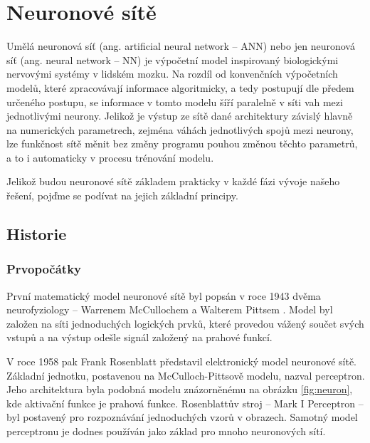 \chapter{Neuronové sítě}
\label{chap:NN}

Umělá neuronová síť (ang. artificial neural network – ANN) nebo jen neuronová
síť (ang. neural network – NN) je výpočetní model inspirovaný biologickými
nervovými systémy v lidském mozku. Na rozdíl od konvenčních výpočetních modelů,
které zpracovávají informace algoritmicky, a tedy postupují dle předem určeného
postupu, se informace v tomto modelu šíří paralelně v síti vah mezi
jednotlivými neurony. Jelikož je výstup ze sítě dané architektury závislý
hlavně na numerických parametrech, zejména váhách jednotlivých spojů mezi
neurony, lze funkčnost sítě měnit bez změny programu pouhou změnou těchto
parametrů, a to i automaticky v procesu trénování modelu.

Jelikož budou neuronové sítě základem prakticky v každé fázi vývoje našeho
řešení, pojďme se podívat na jejich základní principy.

\section{Historie}
\label{sec:NN_History}

\subsection{Prvopočátky}
První matematický model neuronové sítě byl popsán v roce 1943 dvěma
neurofyziology – Warrenem McCullochem a Walterem Pittsem \cite{McCulloch1943}.
Model byl založen na síti jednoduchých logických prvků, které provedou vážený
součet svých vstupů a na výstup odešle signál založený na prahové funkcí.

V roce 1958 pak Frank Rosenblatt představil elektronický model neuronové sítě.
Základní jednotku, postavenou na McCulloch-Pittsově modelu, nazval perceptron.
\cite{Rosenblatt1958} Jeho architektura byla podobná modelu znázorněnému na
obrázku \ref{fig:neuron}, kde aktivační funkce je prahová funkce. Rosenblattův
stroj – Mark I Perceptron – byl postavený pro rozpoznávání jednoduchých vzorů v
obrazech.
Samotný model perceptronu je dodnes používán jako základ pro mnoho neuronových
sítí.


